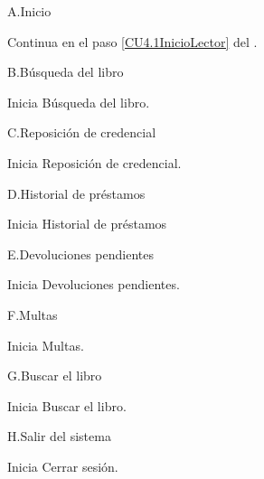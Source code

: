 				
		\begin{UCtrayectoriaA}{A.}{Inicio}

			\UCpaso Continua en el paso \ref{CU4.1InicioLector} del .
		
		\end{UCtrayectoriaA}

				
		\begin{UCtrayectoriaA}{B.}{Búsqueda del libro}

			\UCpaso Inicia  Búsqueda del libro.
		
		\end{UCtrayectoriaA}

				
		\begin{UCtrayectoriaA}{C.}{Reposición de credencial}

			\UCpaso Inicia  Reposición de credencial.
		
		\end{UCtrayectoriaA}				

				
		\begin{UCtrayectoriaA}{D.}{Historial de préstamos}

			\UCpaso Inicia  Historial de préstamos
		
		\end{UCtrayectoriaA}

				
		\begin{UCtrayectoriaA}{E.}{Devoluciones pendientes}

			\UCpaso Inicia  Devoluciones pendientes.
		
		\end{UCtrayectoriaA}

				
		\begin{UCtrayectoriaA}{F.}{Multas}

			\UCpaso Inicia  Multas.
		
		\end{UCtrayectoriaA}				
				
		\begin{UCtrayectoriaA}{G.}{Buscar el libro}

			\UCpaso Inicia  Buscar el libro.
		
		\end{UCtrayectoriaA}

				
		\begin{UCtrayectoriaA}{H.}{Salir del sistema}

			\UCpaso Inicia  Cerrar sesión.
		
		\end{UCtrayectoriaA}

